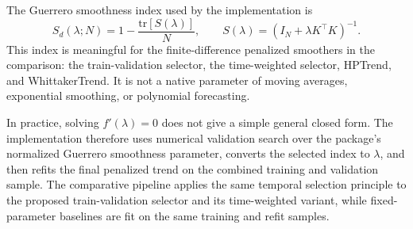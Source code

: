 The Guerrero smoothness index used by the implementation is
\[
  S_d(\lambda; N)
  =
  1 -
  \frac{\mathrm{tr}\left[S(\lambda)\right]}{N},
  \qquad
  S(\lambda)=\left(I_N+\lambda K^\top K\right)^{-1}.
\]
This index is meaningful for the finite-difference penalized smoothers in the
comparison: the train-validation selector, the time-weighted selector, HPTrend,
and WhittakerTrend. It is not a native parameter of moving averages,
exponential smoothing, or polynomial forecasting.

In practice, solving \(f'(\lambda)=0\) does not give a simple general closed
form. The implementation therefore uses numerical validation search over the
package's normalized Guerrero smoothness parameter, converts the selected index
to \(\lambda\), and then refits the final penalized trend on the combined
training and validation sample. The comparative pipeline applies the same
temporal selection principle to the proposed train-validation selector and its
time-weighted variant, while fixed-parameter baselines are fit on the same
training and refit samples.
